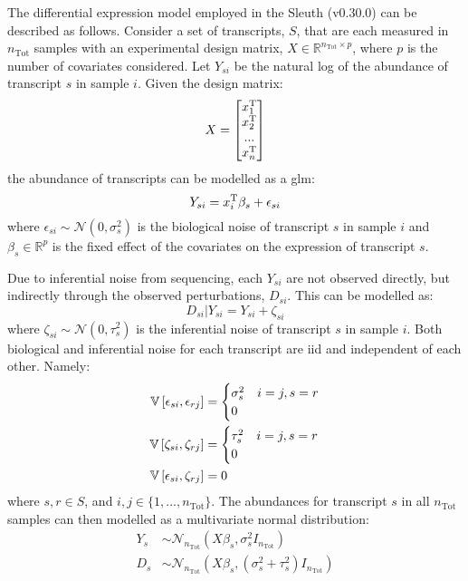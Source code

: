The differential expression model employed in the Sleuth (v0.30.0) \cite{pimentelDifferentialAnalysisRNAseq2017,yiGenelevelDifferentialAnalysis2018} can be described as follows.
Consider a set of transcripts, $S$, that are each measured in $n_\mathrm{Tot}$ samples with an experimental design matrix, $X \in \mathbb{R}^{n_\mathrm{Tot} \times p}$, where $p$ is the number of covariates considered.
Let $Y_{si}$ be the natural log of the abundance of transcript $s$ in sample $i$.
Given the design matrix:
%
\begin{equation}
  X = \begin{bmatrix}
    x_1^{\mathrm{T}} \\
    x_2^{\mathrm{T}} \\
    ... \\
    x_n^{\mathrm{T}}
  \end{bmatrix}
\end{equation}
%
the abundance of transcripts can be modelled as a \gls{glm}:
%
\begin{equation}
  Y_{si} = x_i^{\mathrm{T}} \beta_s + \epsilon_{si}
\end{equation}
%
where $\epsilon_{si} \sim \mathcal{N}(0, \sigma_s^2)$ is the biological noise of transcript $s$ in sample $i$ and $\beta_s \in \mathbb{R}^p$ is the fixed effect of the covariates on the expression of transcript $s$.

Due to inferential noise from sequencing, each $Y_{si}$ are not observed directly, but indirectly through the observed perturbations, $D_{si}$.
This can be modelled as:
%
\begin{equation}
  D_{si} | Y_{si} = Y_{si} + \zeta_{si}
\end{equation}
%
where $\zeta_{si} \sim \mathcal{N}(0, \tau_s^2)$ is the inferential noise of transcript $s$ in sample $i$.
Both biological and inferential noise for each transcript are \gls{iid} and independent of each other.
Namely:
%
\begin{align}
  \mathbb{V} \left[ \epsilon_{si}, \epsilon_{rj} \right] & =
  \begin{cases}
    \sigma_s^2 & i = j, s = r \\
    0
  \end{cases}                     \\
  \mathbb{V} \left[ \zeta_{si}, \zeta_{rj} \right]       & =
  \begin{cases}
    \tau_s^2 & i = j, s = r \\
    0
  \end{cases}                     \\
  \mathbb{V} \left[ \epsilon_{si}, \zeta_{rj} \right]    & = 0
\end{align}
%
where $s, r \in S$, and $i, j \in \{1, ..., n_\mathrm{Tot} \}$.
The abundances for transcript $s$ in all $n_\mathrm{Tot}$ samples can then modelled as a multivariate normal distribution:
%
\begin{align}
  Y_{s} & \sim \mathcal{N}_{n_\mathrm{Tot}}(X \beta_s, \sigma_s^2 I_{n_\mathrm{Tot}})             \\
  D_{s} & \sim \mathcal{N}_{n_\mathrm{Tot}}(X \beta_s, (\sigma_s^2 + \tau_s^2)I_{n_\mathrm{Tot}})
\end{align}
%

